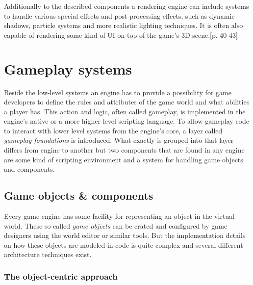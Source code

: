 Additionally to the described components a rendering engine can include systems to handle various special effects and post processing effects, such as dynamic shadows, particle systems and more realistic lighting techniques. It is often also capable of rendering some kind of \ac{UI} on top of the game's 3D scene.\cite{GEA_2}[p. 40-43]

\section{Gameplay systems}

Beside the low-level systems an engine has to provide a possibility for game developers to define the rules and attributes of the game world and what abilities a player has. This action and logic, often called gameplay, is implemented in the engine's native or a more higher level scripting language. To allow gameplay code to interact with lower level systems from the engine's core, a layer called \textit{gameplay foundations} is introduced. What exactly is grouped into that layer differs from engine to another but two components that are found in any engine are some kind of scripting environment and a system for handling game objects and components.

\subsection{Game objects \& components}

Every game engine has some facility for representing an object in the virtual world. These so called \textit{game objects} can be crated and configured by game designers using the world editor or similar tools. But the implementation details on how these objects are modeled in code is quite complex and several different architecture techniques exist. 

\subsubsection{The object-centric approach}

